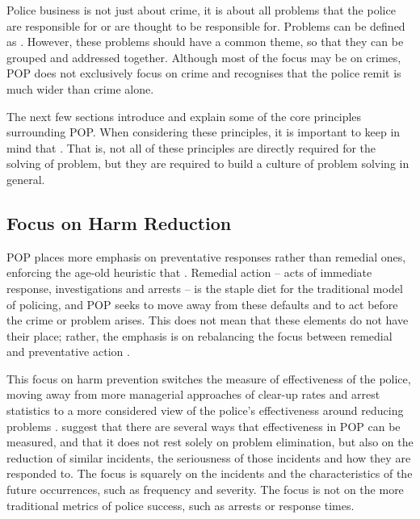 Police business is not just about crime, it is about all problems that the police are responsible for or are thought to be responsible for. Problems can be defined as   \parencite{popchap11}. However, these problems should have a common theme, so that they can be grouped and addressed together. Although most of the focus may be on crimes, POP does not exclusively focus on crime and recognises that the police remit is much wider than crime alone.

The next few sections introduce and explain some of the core principles surrounding POP. When considering these principles, it is important to keep in mind that  \parencite{scott2020problem}. That is, not all of these principles are directly required for the solving of  problem, but they are required to build a culture of problem solving in general.

\subsection{Focus on Harm Reduction}POP places more emphasis on preventative responses rather than remedial ones, enforcing the age-old heuristic that  . Remedial action – acts of immediate response, investigations and arrests – is the staple diet for the traditional model of policing, and POP seeks to move away from these defaults and to act before the crime or problem arises. This does not mean that these elements do not have their place; rather, the emphasis is on rebalancing the focus between remedial and preventative action \parencite{goldstein1990}. 

This focus on harm prevention switches the measure of effectiveness of the police, moving away from more managerial approaches of clear-up rates and arrest statistics to a more considered view of the police’s effectiveness around reducing problems \parencite{goldstein1990}.  \textcite{eck1987problem} suggest that there are several ways that effectiveness in POP can be measured, and that it does not rest solely on problem elimination, but also on the reduction of similar incidents, the seriousness of those incidents and how they are responded to. The focus is squarely on the incidents and the characteristics of the future occurrences, such as frequency and severity. The focus is not on the more traditional metrics of police success, such as arrests or response times.

